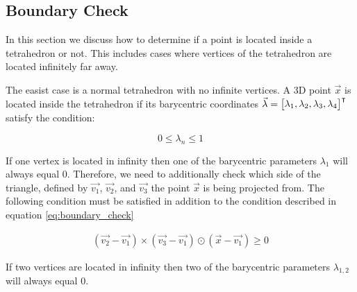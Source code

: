 \subsection{Boundary Check}

In this  section  we  discuss  how  to  determine if a point is located inside a
tetrahedron or not. This includes cases  where  vertices  of the tetrahedron are
located infinitely far away.

The easist case is  a  normal  tetrahedron with no infinite vertices. A 3D point
$\vec{x}$  is  located  inside  the  tetrahedron  if its barycentric coordinates
$\vec{\lambda}  =  \begin{bmatrix}  \lambda_1,  \lambda_2, \lambda_3,  \lambda_4
\end{bmatrix} ^\intercal$ satisfy the condition:

\begin{equation}
    \label{eq:boundary_check}
    0\le\lambda_n\le 1
\end{equation}

If one vertex is  located  in  infinity  then  one of the barycentric parameters
$\lambda_1$ will always equal 0. Therefore, we need  to additionally check which
side of  the  triangle, defined by $\vec{v_1}$, $\vec{v_2}$, and $\vec{v_3}$ the
point  $\vec{x}$ is being  projected  from.  The  following  condition  must  be
satisfied   in   addition    to    the    condition    described   in   equation
\ref{eq:boundary_check}

\begin{align}
    \left(\vec{v_2}-\vec{v_1}\right)\times\left(\vec{v_3}-\vec{v_1}\right) \odot \left(\vec{x}-\vec{v_1}\right) \ge 0
\end{align}

If  two vertices are located in infinity then two of the barycentric  parameters
$\lambda_{1,2}$ will always equal 0.
